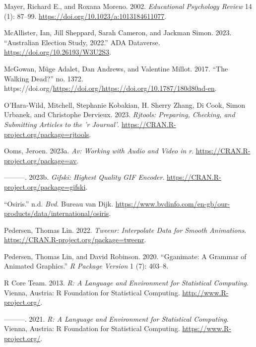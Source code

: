 \begin{CSLReferences}{1}{0}
\leavevmode{}%
Mayer, Richard E., and Roxana Moreno. 2002. \emph{Educational Psychology Review} 14 (1): 87--99. \url{https://doi.org/10.1023/a:1013184611077}.

\leavevmode{}%
McAllister, Ian, Jill Sheppard, Sarah Cameron, and Jackman Simon. 2023. {``Australian Election Study, 2022.''} ADA Dataverse. \url{https://doi.org/10.26193/W3U2S3}.

\leavevmode{}%
McGowan, Müge Adalet, Dan Andrews, and Valentine Millot. 2017. {``The Walking Dead?''} no. 1372. https://doi.org/\url{https://doi.org/https://doi.org/10.1787/180d80ad-en}.

\leavevmode{}%
O'Hara-Wild, Mitchell, Stephanie Kobakian, H. Sherry Zhang, Di Cook, Simon Urbanek, and Christophe Dervieux. 2023. \emph{Rjtools: Preparing, Checking, and Submitting Articles to the 'r Journal'}. \url{https://CRAN.R-project.org/package=rjtools}.

\leavevmode{}%
Ooms, Jeroen. 2023a. \emph{Av: Working with Audio and Video in r}. \url{https://CRAN.R-project.org/package=av}.

\leavevmode{}%
---------. 2023b. \emph{Gifski: Highest Quality GIF Encoder}. \url{https://CRAN.R-project.org/package=gifski}.

\leavevmode{}%
{``Osiris.''} n.d. \emph{Bvd}. Bureau van Dijk. \url{https://www.bvdinfo.com/en-gb/our-products/data/international/osiris}.

\leavevmode{}%
Pedersen, Thomas Lin. 2022. \emph{Tweenr: Interpolate Data for Smooth Animations}. \url{https://CRAN.R-project.org/package=tweenr}.

\leavevmode{}%
Pedersen, Thomas Lin, and David Robinson. 2020. {``Gganimate: A Grammar of Animated Graphics.''} \emph{R Package Version} 1 (7): 403--8.

\leavevmode{}%
R Core Team. 2013. \emph{R: A Language and Environment for Statistical Computing}. Vienna, Austria: R Foundation for Statistical Computing. \url{http://www.R-project.org/}.

\leavevmode{}%
---------. 2021. \emph{R: A Language and Environment for Statistical Computing}. Vienna, Austria: R Foundation for Statistical Computing. \url{https://www.R-project.org/}.


\end{CSLReferences}

